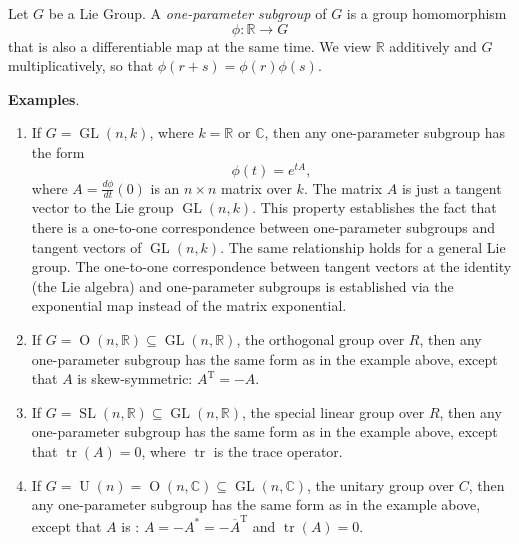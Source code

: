 \documentclass[12pt]{article}
\begin{document}
Let $G$ be a Lie Group.  A 
\emph{one-parameter subgroup} of $G$ is a group homomorphism $$\phi\colon\mathbb{R}\to G$$ that is also a differentiable 
map at the same time.  We view $\mathbb{R}$ additively and $G$
multiplicatively, so that $\phi(r+s)=\phi(r)\phi(s)$.

\textbf{Examples}.
\begin{enumerate}
\item If $G=\operatorname{GL}(n,k)$, where $k=\mathbb{R}$ or $\mathbb{C}$, then any one-parameter subgroup has the form
$$\phi(t)=e^{tA},$$ where $A=\frac{d\phi}{dt}(0)$ is an $n\times n$ matrix over $k$.  The matrix $A$ is just a 
tangent vector to the Lie group $\operatorname{GL}(n,k)$.  This property establishes the fact that there is a 
one-to-one correspondence between one-parameter subgroups and tangent vectors of $\operatorname{GL}(n,k)$. The same relationship holds for a general Lie group.
The one-to-one correspondence between tangent vectors at the identity (the
Lie algebra) and one-parameter subgroups is established via the exponential
map instead of the matrix exponential.
\item If $G=\operatorname{O}(n,\mathbb{R})\subseteq\operatorname{GL}(n,\mathbb{R})$, the orthogonal group over $R$, then 
any one-parameter subgroup has the same form as in the example above, except that $A$ is skew-symmetric: 
$A^{\operatorname{T}}=-A$.
\item If $G=\operatorname{SL}(n,\mathbb{R})\subseteq\operatorname{GL}(n,\mathbb{R})$, the special linear group over $R$, 
then any one-parameter subgroup has the same form as in the example above, except that $\operatorname{tr}(A)=0$, where 
$\operatorname{tr}$ is the trace operator.
\item If $G=\operatorname{U}(n)=\operatorname{O}(n,\mathbb{C})\subseteq\operatorname{GL}(n,\mathbb{C})$, the unitary 
group over $C$, then any one-parameter subgroup has the same form as in the example above, except that $A$ is : $A=-A^{*}=-\overline{A}^{\operatorname{T}}$ and $\operatorname{tr}(A)=0$.
\end{enumerate}
\end{document}
